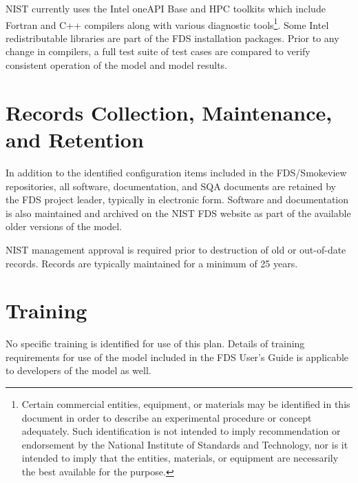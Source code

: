 \documentclass[11pt]{book}
\begin{document}
NIST currently uses the Intel oneAPI Base and HPC toolkits which include Fortran and C++ compilers along with various diagnostic tools\footnote{Certain commercial entities, equipment, or materials may be identified in this document in order to describe an experimental procedure or concept adequately. Such identification is not intended to imply recommendation or endorsement by the National Institute of Standards and Technology, nor is it intended to imply that the entities, materials, or equipment are necessarily the best available for the purpose.}. Some Intel redistributable libraries are part of the FDS installation packages.  Prior to any change in compilers, a full test suite of test cases are compared to verify consistent operation of the model and model results.

\section{Records Collection, Maintenance, and Retention}

In addition to the identified configuration items included in the FDS/Smokeview repositories, all software, documentation, and SQA documents are retained by the FDS project leader, typically in electronic form. Software and documentation is also maintained and archived on the NIST FDS website as part of the available older versions of the model.

NIST management approval is required prior to destruction of old or out-of-date records. Records are typically maintained for a minimum of 25 years.

\section{Training}

No specific training is identified for use of this plan.  Details of training requirements for use of the model included in the FDS User's Guide is applicable to developers of the model as well.




\backmatter
\nopart



\printindex
\end{document}
